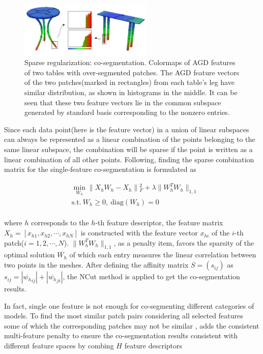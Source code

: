 \begin{figure}[ht]
  \centering
  \includegraphics[width=2.5in]{images/co-segmentationAGD}
  \caption{Sparse regularization: co-segmentation\cite{hu2012co}. Colormaps of AGD features of two tables with over-segmented patches. The AGD feature vectors of the two patches(marked in rectangles) from each table's leg have similar distribution, as shown in histograms in the middle. It can be seen that these two feature vectors lie in the common subspace generated by standard basis corresponding to the nonzero entries.}
  \label{fig:co-segmentationAGD}
\end{figure}


Since each data point(here is the feature vector) in a union of linear subspaces can always be represented as a linear combination of the points belonging to the same linear subspace,
the combination will be sparse if the point is written as a linear combination of all other points.
Following\cite{elhamifar2009sparse,wang2011efficient}, finding the sparse combination matrix for the single-feature co-segmentation is formulated as

\small{
\begin{equation}
 \label{eq:SSC}
 \begin{split}
 &\min_{W_{h}}\|X_{h}W_{h}-X_{h}\|{_{F}^2}+\lambda\|W_{h}^{T}W_{h}\|_{1,1} \\
 &\mathrm{s.t.}~W_{h}\ge0,~\textrm{diag}(W_{h})=0
 \end{split}
\end{equation}
}
\\
where $h$ corresponds to the $h$-th feature descriptor,
the feature matrix $X_{h}=[x_{h1},x_{h2},\cdots,x_{hN}]$ is constructed with the feature vector $x_{hi}$ of the $i$-th patch($i=1,2,\cdots,N$).
$\|W_{h}^{T}W_{h}\|_{1,1}$, as a penalty item, favors the sparsity of the optimal solution $\overline{W_{h}}$ of which each entry measures the linear correlation between two points in the meshes.
After defining the affinity matrix $S=(s_{ij})$ as $s_{ij}=|\overline{w_{h}}_{ij}|+|\overline{w_{h}}_{ji}|$, the NCut method\cite{shi2000normalized} is applied to get the co-segmentation results.

In fact, single one feature is not enough for co-segmenting different categories of models.
To find the most similar patch pairs considering all selected features some of which the corresponding patches may not be similar ,
\cite{hu2012co} adds the consistent multi-feature penalty to ensure the co-segmentation results consistent with different feature spaces by combing $H$ feature descriptors

